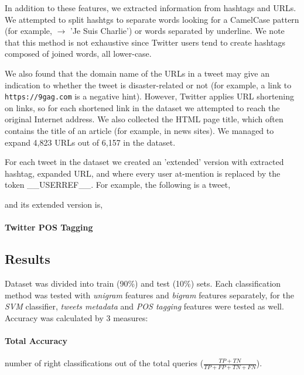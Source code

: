 \documentclass[letterpaper,twocolumn,10pt]{article}
\begin{document}
In addition to these features, we extracted information from hashtags and URLs. We attempted to split hashtgs to separate words
looking for a CamelCase pattern (for example,  $\rightarrow$ 'Je Suis Charlie') or words separated by underline. We note that this method is not exhaustive since Twitter users tend to create hashtags composed of joined words, all lower-case.

We also found that the domain name of the URLs in a tweet may give an indication to whether the tweet is disaster-related or not (for example, a link to \texttt{https://9gag.com} is a negative hint). However, Twitter applies URL shortening on links, so for each shortened link in the dataset we attempted to reach the original Internet address. We also collected the HTML page title, which often contains the title of an article (for example, in news sites). We managed to expand 4,823 URLs out of 6,157 in the dataset.

For each tweet in the dataset we created an 'extended' version with extracted hashtag, expanded URL, and where every user at-mention is replaced by the token \_\_USERREF\_\_. For example, the following is a tweet,

\begin{center}
	\parbox{190pt}{}
\end{center}

and its extended version is,

\begin{center}
	\parbox{190pt}{}
\end{center}

\paragraph{Twitter POS Tagging}

\subsection{Results}
Dataset was divided into train (90\%) and test (10\%) sets. Each classification method was tested with \textit{unigram} features and \textit{bigram} features separately, for the \textit{SVM} classifier, \textit{tweets metadata} and \textit{POS tagging} features were tested as well. \\
Accuracy was calculated by 3 measures:
\paragraph{Total Accuracy} number of right classifications out of the total queries ($ \frac{TP + TN}{TP + FP + TN + FN } $).
\end{document}
